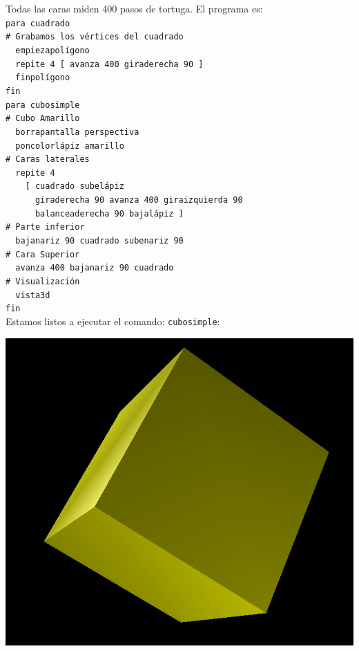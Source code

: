 Todas las caras miden 400 pasos de tortuga. El programa es: \\

\noindent\texttt{para cuadrado} \\
\texttt{\# Grabamos los v\'ertices del cuadrado} \\
\verb+  +\texttt{empiezapol\'igono} \\
\verb+  +\texttt{repite 4 [ avanza 400 giraderecha 90 ]} \\
\verb+  +\texttt{finpol\'igono} \\
\texttt{fin} \\

\noindent\texttt{para cubosimple} \\
\texttt{\# Cubo Amarillo} \\
\verb+  +\texttt{borrapantalla perspectiva} \\
\verb+  +\texttt{poncolorl\'apiz amarillo} \\
\texttt{\# Caras laterales} \\
\verb+  +\texttt{repite 4} \\
\verb+    +\texttt{[ cuadrado subel\'apiz} \\
\verb+      +\texttt{giraderecha 90 avanza 400 giraizquierda 90} \\
\verb+      +\texttt{balanceaderecha 90 bajal\'apiz ]} \\
\texttt{\# Parte inferior} \\
\verb+  +\texttt{bajanariz 90 cuadrado subenariz 90} \\
\texttt{\# Cara Superior} \\
\verb+  +\texttt{avanza 400 bajanariz 90 cuadrado} \\
\texttt{\# Visualizaci\'on} \\
\verb+  +\texttt{vista3d} \\
\texttt{fin} \\

Estamos listos a ejecutar el comando: \verb+cubosimple+:
\begin{center}
   \includegraphics[scale=0.2]{Imagenes/05_Primitivas/3dCube1.png}
\end{center}

